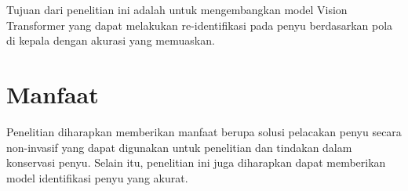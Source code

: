 Tujuan dari penelitian ini adalah untuk mengembangkan model Vision Transformer yang dapat melakukan re-identifikasi pada penyu berdasarkan pola di kepala dengan akurasi yang memuaskan.

\section{Manfaat}

Penelitian diharapkan memberikan manfaat berupa solusi pelacakan penyu secara non-invasif yang dapat digunakan untuk penelitian dan tindakan dalam konservasi penyu. 
Selain itu, penelitian ini juga diharapkan dapat memberikan model identifikasi penyu yang akurat.